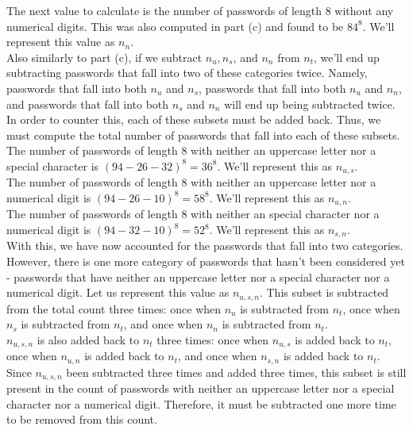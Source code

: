 \documentclass[11pt]{article}
\theoremstyle{definition}
\begin{document}
\begin{enumerate}
\begin{enumerate}
The next value to calculate is the number of passwords of length 8 without any numerical digits. This was also computed in part (c) and found to be $84^8$. We'll represent this value as $n_{n}$.\\

Also similarly to part (c), if we subtract $n_{u}, n_{s}$, and $n_{n}$ from $n_{t}$, we'll end up subtracting passwords that fall into two of these categories twice. Namely,
passwords that fall into both $n_{u}$ and $n_{s}$, passwords that fall into both $n_{u}$ and $n_{n}$, and passwords that fall into both $n_{s}$ and $n_{n}$ will end up
being subtracted twice. In order to counter this, each of these subsets must be added back. Thus, we must compute the total number of passwords that fall into each of these subsets.\\

The number of passwords of length 8 with neither an uppercase letter nor a special character is $(94 - 26 - 32)^8 = 36^8$. We'll represent this as $n_{u, s}$.\\

The number of passwords of length 8 with neither an uppercase letter nor a numerical digit is $(94 - 26 - 10)^8 = 58^8$. We'll represent this as $n_{u, n}$.\\

The number of passwords of length 8 with neither an special character nor a numerical digit is $(94 - 32 - 10)^8 = 52^8$. We'll represent this as $n_{s, n}$.\\

With this, we have now accounted for the passwords that fall into two categories. However, there is one more category of passwords that hasn't been considered yet - passwords that have neither an uppercase letter
nor a special character nor a numerical digit. Let us represent this value as $n_{u,s,n}$. This subset is subtracted from the total count three times: once when $n_{u}$ is subtracted from $n_{t}$,
once when $n_{s}$ is subtracted from $n_{t}$, and once when $n_{n}$ is subtracted from $n_{t}$.\\
$n_{u,s,n}$ is also added back to $n_{t}$ three times: once when $n_{u,s}$ is added back to $n_{t}$, once when $n_{u,n}$ is added back to $n_{t}$, and
once when $n_{s,n}$ is added back to $n_{t}$. Since $n_{u,s,n}$ been subtracted three times and added three times, this subset is still present in the count of passwords
with neither an uppercase letter nor a special character nor a numerical digit. Therefore, it must be subtracted one more time to be removed from this count.\\


\end{enumerate}
\end{enumerate}
\end{document}
